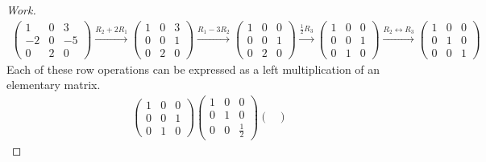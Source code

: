 \documentclass{article}
\begin{document}
\begin{proof}[Work]
  \begin{align*}
    \begin{pmatrix}
      1  & 0 & 3  \\
      -2 & 0 & -5 \\
      0  & 2 & 0
    \end{pmatrix} \xrightarrow{R_2 + 2R_1}
    \begin{pmatrix}
      1 & 0 & 3 \\
      0 & 0 & 1 \\
      0 & 2 & 0
    \end{pmatrix} \xrightarrow{R_1 - 3R_2}
    \begin{pmatrix}
      1 & 0 & 0 \\
      0 & 0 & 1 \\
      0 & 2 & 0
    \end{pmatrix} \xrightarrow{\frac{1}{2}R_3}
    \begin{pmatrix}
      1 & 0 & 0 \\
      0 & 0 & 1 \\
      0 & 1 & 0
    \end{pmatrix} \xrightarrow{R_2 \leftrightarrow R_3}
    \begin{pmatrix}
      1 & 0 & 0 \\
      0 & 1 & 0 \\
      0 & 0 & 1
    \end{pmatrix}
  \end{align*}
  Each of these row operations can be expressed as a left multiplication of an elementary matrix.
  \begin{align*}
    \begin{pmatrix}
      1 & 0 & 0 \\
      0 & 0 & 1 \\
      0 & 1 & 0
    \end{pmatrix}
    \begin{pmatrix}
      1 & 0 & 0           \\
      0 & 1 & 0           \\
      0 & 0 & \frac{1}{2}
    \end{pmatrix}
    \begin{pmatrix}

\end{pmatrix}
\end{align*}
\end{proof}
\end{document}
